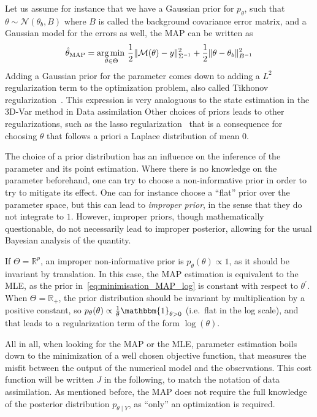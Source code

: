 \documentclass[../../Main_ManuscritThese.tex]{subfiles}
\begin{document}
Let us assume for instance that we have a Gaussian prior for $p_\theta$, such that $\theta \sim \mathcal{N}(\theta_{b},B)$ where $B$ is called the background covariance error matrix, and a Gaussian model for the errors as well, the MAP can be written as
\begin{equation}
  \hat{\theta}_{\mathrm{MAP}} = \operatorname*{arg\,min \,}_{\theta \in \Theta} \frac{1}{2}\| \mathcal{M}(\theta) - y\|^2_{\Sigma^{-1}} + \frac{1}{2}\|\theta - \theta_b\|^2_{B^{-1}}
\end{equation}
Adding a Gaussian prior for the parameter comes down to adding a $L^2$ regularization term to the optimization problem, also called Tikhonov regularization~\cite{tikhonov_solutions_1977}. This expression is very analoguous to the state estimation in the 3D-Var method in Data assimilation 
Other choices of priors leads to other regularizations, such as the lasso regularization~\cite{tibshirani_regression_2011} that is a consequence for choosing $\theta$ that follows a priori a Laplace distribution of mean $0$.


The choice of a prior distribution has an influence on the inference of the parameter and its point estimation. Where there is no knowledge on the parameter beforehand, one can try to choose a non-informative prior in order to try to mitigate its effect. One can for instance choose a ``flat'' prior over the parameter space, but this can lead to \emph{improper prior}, in the sense that they do not integrate to $1$. However, improper priors, though mathematically questionable, do not necessarily lead to improper posterior, allowing for the usual Bayesian analysis of the quantity.

If $\Theta = \mathbb{R}^p$, an improper non-informative prior is $p_{\theta}(\theta) \propto 1$, as it should be invariant by translation. In this case, the MAP estimation is equivalent to the MLE, as the prior in~\cref{eq:minimisation_MAP_log} is constant with respect to $\theta^{\prime}$.
When $\Theta = \mathbb{R}_+$, the prior distribution should be invariant by multiplication by a positive constant, so $p_{\theta}(\theta) \propto \frac{1}{\theta}\mathbbm{1}_{\theta > 0}$ (i.e.\ flat in the log scale), and that leads to a regularization term of the form $\log(\theta)$.


All in all, when looking for the MAP or the MLE, parameter estimation boils down to the minimization of a well chosen objective function, that measures the misfit between the output of the numerical model and the observations. This cost function will be written $J$ in the following, to match the notation of data assimilation. As mentioned before, the MAP does not require the full knowledge of the posterior distribution $p_{\theta \mid Y}$, as ``only'' an optimization is required.
\end{document}
